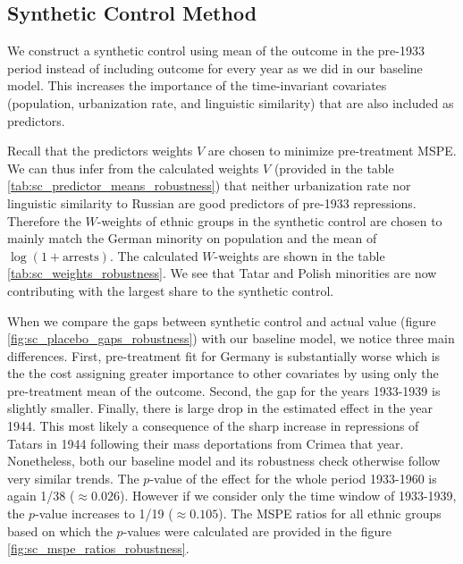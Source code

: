 \subsection{Synthetic Control Method}
 We construct a synthetic control  using mean of the outcome in the pre-1933 period instead of including outcome for every year as we did in our baseline model. This increases the importance of the time-invariant covariates (population, urbanization rate, and linguistic similarity) that are also included as predictors.


Recall that the predictors weights $V$ are chosen to minimize pre-treatment MSPE. We can thus infer from the calculated  weights $V$ (provided in the table \ref{tab:sc_predictor_means_robustness})  that neither urbanization rate nor linguistic similarity to Russian are good predictors of pre-1933 repressions. 
Therefore the $W$-weights of ethnic groups in the synthetic control are chosen to mainly match the German minority on population and the mean of $\log\left(1 + \text{arrests}\right)$. 
 The calculated $W$-weights  are shown in the table \ref{tab:sc_weights_robustness}. We see that Tatar and Polish minorities are now contributing with the largest share to the synthetic control. 



When we compare the gaps between synthetic control and actual value (figure \ref{fig:sc_placebo_gaps_robustness}) with our baseline model, we notice three main differences. First, pre-treatment fit for Germany is substantially worse which is the the cost
assigning greater importance to other covariates by  using only the pre-treatment mean of the outcome. Second, the gap for the years 1933-1939 is slightly smaller. Finally, there is large drop in the estimated effect in the year 1944. This most likely a consequence of the sharp increase in repressions of Tatars in 1944 following their mass deportations from Crimea that year. 
Nonetheless, both our baseline model and its robustness check otherwise follow very similar trends.
The $p$-value of the effect for the whole period 1933-1960  is again 1/38 ($\approx 0.026$). However if we consider only the time window of  1933-1939, the 
$p$-value increases to 1/19 ($\approx 0.105$). The MSPE ratios for all ethnic groups based on which the $p$-values were calculated are provided in the figure \ref{fig:sc_mspe_ratios_robustness}.

